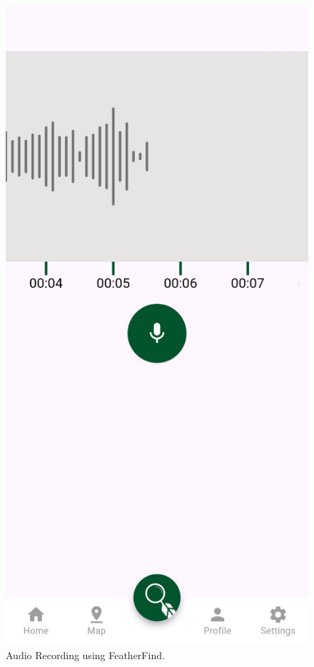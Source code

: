 \begin{figure}[h!]
    \centering
    \includegraphics[scale=0.18]{images/Recordingpage.jpg}
    \caption{Audio Recording using FeatherFind.}
\end{figure}

